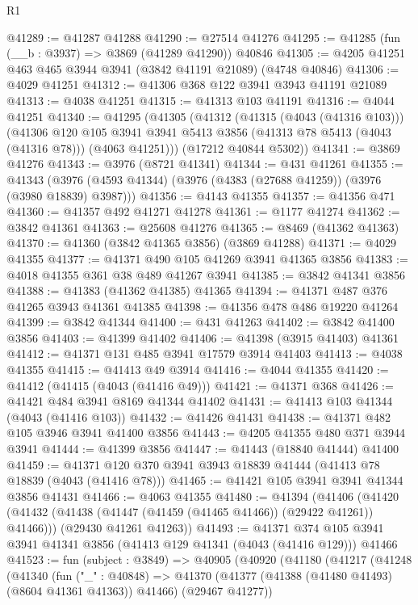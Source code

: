 \begin{lexlean}{R1}
\begin{coremodule}
@41289 := @41287 @41288
@41290 := @27514 @41276
@41295 := @41285 (fun (__b : @3937) => @3869 (@41289 @41290)) @40846
@41305 := @4205 @41251 @463 @465 @3944 @3941 (@3842 @41191 @21089) (@4748 @40846)
@41306 := @4029 @41251
@41312 := @41306 @368 @122 @3941 @3943 @41191 @21089
@41313 := @4038 @41251
@41315 := @41313 @103 @41191
@41316 := @4044 @41251
@41340 := @41295
    (@41305
      (@41312
        (@41315 (@4043 (@41316 @103)))
        (@41306
          @120
          @105
          @3941
          @3941
          @5413
          @3856
          (@41313 @78 @5413 (@4043 (@41316 @78)))
          (@4063 @41251)))
      (@17212 @40844 @5302))
@41341 := @3869 @41276
@41343 := @3976 (@8721 @41341)
@41344 := @431 @41261
@41355 := @41343 (@3976 (@4593 @41344) (@3976 (@4383 (@27688 @41259)) (@3976 (@3980 @18839) @3987)))
@41356 := @4143 @41355
@41357 := @41356 @471
@41360 := @41357 @492 @41271 @41278
@41361 := @1177 @41274
@41362 := @3842 @41361
@41363 := @25608 @41276
@41365 := @8469 (@41362 @41363)
@41370 := @41360 (@3842 @41365 @3856) (@3869 @41288)
@41371 := @4029 @41355
@41377 := @41371 @490 @105 @41269 @3941 @41365 @3856
@41383 := @4018 @41355 @361 @38 @489 @41267 @3941
@41385 := @3842 @41341 @3856
@41388 := @41383 (@41362 @41385) @41365
@41394 := @41371 @487 @376 @41265 @3943 @41361 @41385
@41398 := @41356 @478 @486 @19220 @41264
@41399 := @3842 @41344
@41400 := @431 @41263
@41402 := @3842 @41400 @3856
@41403 := @41399 @41402
@41406 := @41398 (@3915 @41403) @41361
@41412 := @41371 @131 @485 @3941 @17579 @3914 @41403
@41413 := @4038 @41355
@41415 := @41413 @49 @3914
@41416 := @4044 @41355
@41420 := @41412 (@41415 (@4043 (@41416 @49)))
@41421 := @41371 @368
@41426 := @41421 @484 @3941 @8169 @41344 @41402
@41431 := @41413 @103 @41344 (@4043 (@41416 @103))
@41432 := @41426 @41431
@41438 := @41371 @482 @105 @3946 @3941 @41400 @3856
@41443 := @4205 @41355 @480 @371 @3944 @3941
@41444 := @41399 @3856
@41447 := @41443 (@18840 @41444) @41400
@41459 := @41371 @120 @370 @3941 @3943 @18839 @41444 (@41413 @78 @18839 (@4043 (@41416 @78)))
@41465 := @41421 @105 @3941 @3941 @41344 @3856 @41431
@41466 := @4063 @41355
@41480 := @41394
    (@41406
      (@41420 (@41432 (@41438 (@41447 (@41459 (@41465 @41466)) (@29422 @41261)) @41466)))
      (@29430 @41261 @41263))
@41493 := @41371
    @374
    @105
    @3941
    @3941
    @41341
    @3856
    (@41413 @129 @41341 (@4043 (@41416 @129)))
    @41466
@41523 := fun (subject : @3849) =>
  @40905
    (@40920
      (@41180
        (@41217
          (@41248
            (@41340
              (fun ("_" : @40848) =>
              @41370 (@41377 (@41388 (@41480 @41493) (@8604 @41361 @41363)) @41466) (@29467 @41277))

\end{coremodule}
\end{lexlean}

